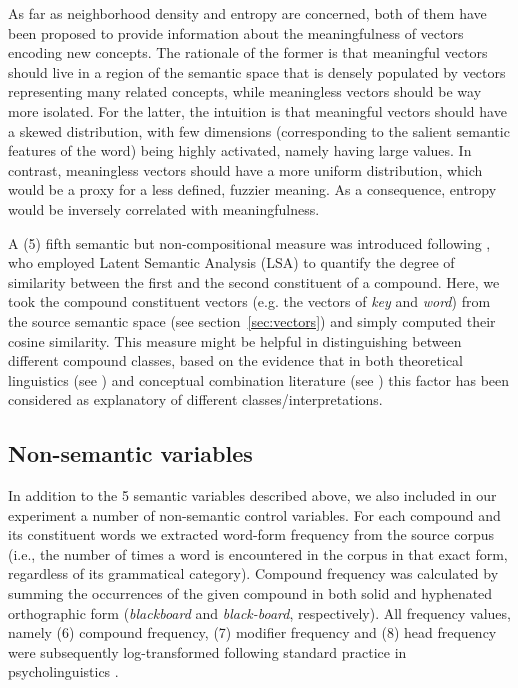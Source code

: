 \documentclass[output=paper]{langsci/langscibook}
\begin{document}
As far as neighborhood density and entropy are concerned, both of them have been proposed to provide information about the meaningfulness of vectors encoding new concepts. The rationale of the former is that meaningful vectors should live in a region of the semantic space that is densely populated by vectors representing many related concepts, while meaningless vectors should be way more isolated. For the latter, the intuition is that meaningful vectors should have a skewed distribution, with few dimensions (corresponding to the salient semantic features of the word) being highly activated, namely having large values. In contrast, meaningless vectors should have a more uniform distribution, which would be a proxy for a less defined, fuzzier meaning. As a consequence, entropy would be inversely correlated with meaningfulness.

A (5) fifth semantic but non-compositional measure was introduced following \cite{lynott2001}, who employed Latent Semantic Analysis (LSA) to quantify the degree of similarity between the first and the second constituent of a compound. Here, we took the compound constituent vectors (e.g. the vectors of \emph{key} and \emph{word}) from the source semantic space (see section~\ref{sec:vectors}) and simply computed their cosine similarity. This measure might be helpful in distinguishing between different compound classes, based on the evidence that in both theoretical linguistics (see \citealt{lieber5OHC}) and conceptual combination literature (see \citealt{wisniewski1996}) this factor has been considered as explanatory of different classes/interpretations.

\subsection{Non-semantic variables}

In addition to the 5 semantic variables described above, we also included in our experiment a number of non-semantic control variables. For each compound and its constituent words we extracted word-form frequency from the source corpus (i.e., the number of times a word is encountered in the corpus in that exact form, regardless of its grammatical category). Compound frequency was calculated by summing the occurrences of the given compound in both solid and hyphenated orthographic form (\emph{blackboard} and \emph{black-board}, respectively). All frequency values, namely (6) compound frequency, (7) modifier frequency and (8) head frequency were subsequently log-transformed following standard practice in psycholinguistics \citep{brysbaert2018}.
\end{document}

